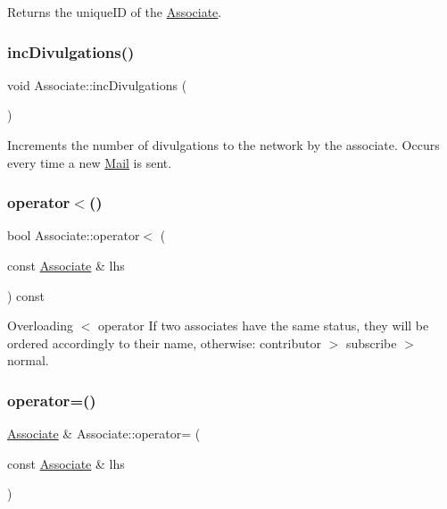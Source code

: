 Returns the unique\+ID of the \mbox{\hyperlink{classAssociate}{Associate}}. 

\mbox{\label{classAssociate_a5d298ea460b494edc46c015af7e1a932}} 
\subsubsection{\texorpdfstring{inc\+Divulgations()}{incDivulgations()}}
{\footnotesize\ttfamily void Associate\+::inc\+Divulgations (\begin{DoxyParamCaption}{ }\end{DoxyParamCaption})}



Increments the number of divulgations to the network by the associate. Occurs every time a new \mbox{\hyperlink{classMail}{Mail}} is sent. 

\mbox{\label{classAssociate_a169cbe6746295386254610c7c9811085}} 
\subsubsection{\texorpdfstring{operator$<$()}{operator<()}}
{\footnotesize\ttfamily bool Associate\+::operator$<$ (\begin{DoxyParamCaption}\item[{const \mbox{\hyperlink{classAssociate}{Associate}} \&}]{lhs }\end{DoxyParamCaption}) const}



Overloading $<$ operator If two associates have the same status, they will be ordered accordingly to their name, otherwise\+: contributor $>$ subscribe $>$ normal. 

\mbox{\label{classAssociate_a3b9d47c7e6dafad03a4b33f7eebec177}} 
\subsubsection{\texorpdfstring{operator=()}{operator=()}}
{\footnotesize\ttfamily \mbox{\hyperlink{classAssociate}{Associate}} \& Associate\+::operator= (\begin{DoxyParamCaption}\item[{const \mbox{\hyperlink{classAssociate}{Associate}} \&}]{lhs }\end{DoxyParamCaption})}



